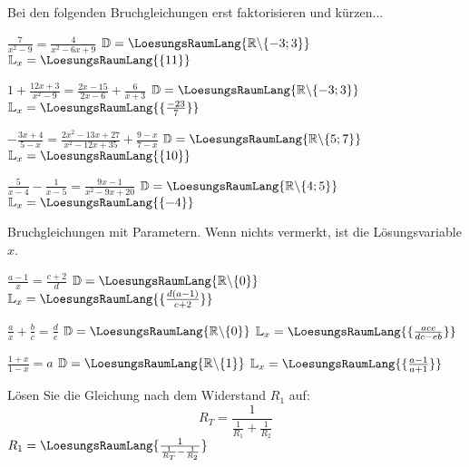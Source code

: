 \platzFuerBerechnungenBisEndeSeite{}

Bei den folgenden Bruchgleichungen erst faktorisieren und kürzen...

\begin{bbwAufgabenBlock}
\item $\frac7{x^2-9} = \frac4{x^2-6x+9}$ \hspace{10mm}    $\mathbb{D}= \LoesungsRaumLang{\mathbb{R}\backslash\{-3; 3\}}$ $\mathbb{L}_x = \LoesungsRaumLang{\{11\}}$
\item $1 + \frac{12x+3}{x^2-9} = \frac{2x-15}{2x-6} + \frac{6}{x+3}$ \hspace{10mm}    $\mathbb{D}= \LoesungsRaumLang{\mathbb{R}\backslash\{-3; 3\}}$ $\mathbb{L}_x = \LoesungsRaumLang{\{\frac{-23}{7}\}}$
\item $- \frac{3x+4}{5-x} = \frac{2x^2-13x+27}{x^2-12x+35} + \frac{9-x}{7-x}$ \hspace{10mm}    $\mathbb{D}= \LoesungsRaumLang{\mathbb{R}\backslash\{5;7\}}$ $\mathbb{L}_x = \LoesungsRaumLang{\{10\}}$\noTRAINER{\newpage}
\item $\frac5{x-4} - \frac1{x-5} = \frac{9x-1}{x^2-9x+20}$ \hspace{10mm}    $\mathbb{D}= \LoesungsRaumLang{\mathbb{R}\backslash\{4;5\}}$ $\mathbb{L}_x = \LoesungsRaumLang{\{-4\}}$
\end{bbwAufgabenBlock}



\platzFuerBerechnungenBisEndeSeite{}







Bruchgleichungen mit Parametern. Wenn nichts vermerkt, ist die
Lösungsvariable $x$.

\begin{bbwAufgabenBlock}
\item $\frac{a-1}x = \frac{c+2}d$ \hspace{10mm}    $\mathbb{D}= \LoesungsRaumLang{\mathbb{R}\backslash\{0\}}$ $\mathbb{L}_x = \LoesungsRaumLang{\{\frac{d(a-1)}{c+2}\}}$
\item $\frac{a}x + \frac{b}c = \frac{d}e$ \hspace{10mm}    $\mathbb{D}= \LoesungsRaumLang{\mathbb{R}\backslash\{0\}}$ $\mathbb{L}_x = \LoesungsRaumLang{\{\frac{ace}{dc-eb}\}}$
\item $\frac{1+x}{1-x} = a$ \hspace{10mm}    $\mathbb{D}= \LoesungsRaumLang{\mathbb{R}\backslash\{1\}}$ $\mathbb{L}_x = \LoesungsRaumLang{\{\frac{a-1}{a+1}\}}$\noTRAINER{\newpage}
\item Lösen Sie die Gleichung nach dem Widerstand $R_1$ auf:
      $$R_T = \frac1{\frac1{R_1} + \frac1{R_2}}$$    $R_1 = \LoesungsRaumLang{\frac1{\frac1{R_T}-\frac1{R_2}}}$
\end{bbwAufgabenBlock}


